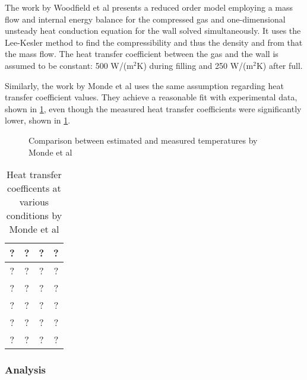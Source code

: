 The work by Woodfield et al \cite{Woodfield2008} presents a reduced order model employing a mass flow and internal energy balance for the compressed gas and one-dimensional unsteady heat conduction equation for the wall solved simultaneously. It uses the Lee-Kesler method \cite{Lee1975} to find the compressibility and thus the density and from that the mass flow. The heat transfer coefficient between the gas and the wall is assumed to be constant: 500 W/(m$^2$K) during filling and 250 W/(m$^2$K) after full. 

Similarly, the work by Monde et al \cite{Monde2007} uses the same assumption regarding heat transfer coefficient values.  They achieve a reasonable fit with experimental data, shown in \cref{fig:mondeFit}, even though the measured heat transfer coefficients were significantly lower, shown in \cref{tab:mondeHValues}.

\begin{figure}[htbp]
\begin{center}
\caption{Comparison between estimated and measured temperatures by Monde et al \cite{Monde2007}}
\label{fig:mondeFit}
\end{center}
\end{figure}

\begin{table}[h]
\centering
  \begin{tabular}{@{} cccc @{}}
    \toprule
    ? & ? & ? & ? \\ 
    \midrule
    ? & ? & ? & ? \\ 
    ? & ? & ? & ? \\ 
    ? & ? & ? & ? \\ 
    ? & ? & ? & ? \\ 
    ? & ? & ? & ? \\ 
    \bottomrule

  \end{tabular}
\caption{Heat transfer coefficents at various conditions by Monde et al \cite{Monde2007}}
\label{tab:mondeHValues}
\end{table}


\subsubsection{Analysis}


